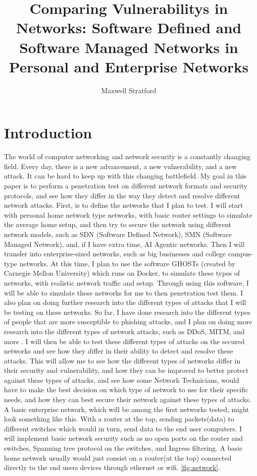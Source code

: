 \documentclass[12pt]{article}
\title{\textbf{Comparing Vulnerabilitys in Networks: 
Software Defined and Software Managed Networks in Personal and Enterprise Networks}}
\author{Maxwell Stratford}
\begin{document}
\maketitle

\section{Introduction}
The world of computer networking and network security is a constantly changing field. Every day,
there is a new advancement, a new vulnerability, and a new attack. It can be hard to keep up with
this changing battlefield. My goal in this paper is to perform a penetration test on different
network formats and security protocols, and see how they differ in the way they detect and
resolve different network attacks. First, is to define the networks that I plan to test. 
I will start with personal home network type networks, with basic router settings to simulate 
the average home setup, and then try to secure the network using different network models, such 
as SDN (Software Defined Network), SMN (Software Managed Network), and, if I have extra time, AI 
Agentic networks. Then I will transfer into enterprise-sized networks, such as big businesses 
and college campus-type networks. At this time, I plan to use the software GHOSTs (created by 
Carnegie Mellon University)\cite{GHOSTSDocumentationGHOSTS} which runs on Docker, to simulate 
these types of networks, with realistic network traffic and setup. Through using this software, 
I will be able to simulate these networks for me to then penetration test them. I also plan on 
doing further research into the different types of attacks that I will be testing on these 
networks. So far, I have done research into the different types of people that are more 
susceptible to phishing attacks\cite{DemographicFactorsKavvadias}, and I plan on doing more
research into the different types of network attacks, such as DDoS, MITM, and more 
\cite{InternetFacingRouterRostami}. 
I will then be able to test these different types of attacks on the secured networks 
and see how they differ in their ability to detect and resolve these attacks. This will 
allow me to see how the different types of networks differ in their security and 
vulnerability, and how they can be improved to better protect against these types of attacks,
and see how some Network Technicians, would have to make the best decision on which type of 
network to use for their specific needs, and how they can best secure their network against 
these types of attacks. A basic enterprise network, which will be among the first networks tested, 
might look something like this. With a router at the top, sending packets(data) to different switches
which would in turn, send data to the end user computers. I will implement basic network security
such as no open ports on the router and switches, Spanning tree protocol on the switches, and 
Ingress filtering. A basic home network usually would just consist on a router(at the top) connected
directly to the end users devices through ethernet or wifi.\cite{thewifiofthings} \ref{fig:network}.
\end{document}
